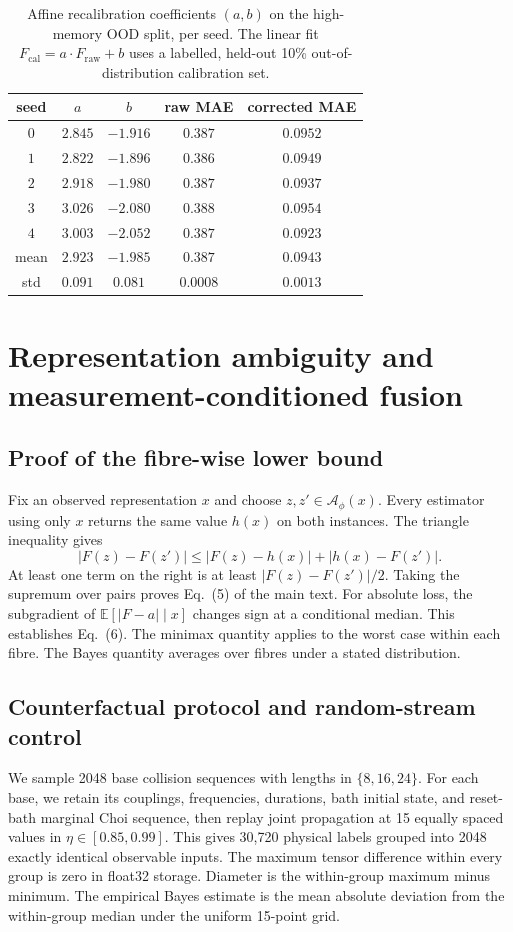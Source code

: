 \documentclass[10pt]{article}
\begin{document}
\begin{table}[h]
\centering
\caption{Affine recalibration coefficients $(a, b)$ on the high-memory OOD split, per seed. The linear fit $F_{\mathrm{cal}} = a \cdot F_{\mathrm{raw}} + b$ uses a labelled, held-out 10\% out-of-distribution calibration set.}
\label{tab:supp_per_seed_ab}
\begin{tabular}{ccccc}
\toprule
seed & $a$ & $b$ & raw MAE & corrected MAE \\
\midrule
$0$ & $2.845$ & $-1.916$ & $0.387$ & $0.0952$ \\
$1$ & $2.822$ & $-1.896$ & $0.386$ & $0.0949$ \\
$2$ & $2.918$ & $-1.980$ & $0.387$ & $0.0937$ \\
$3$ & $3.026$ & $-2.080$ & $0.388$ & $0.0954$ \\
$4$ & $3.003$ & $-2.052$ & $0.387$ & $0.0923$ \\
\midrule
mean & $2.923$ & $-1.985$ & $0.387$ & $0.0943$ \\
std & $0.091$ & $0.081$ & $0.0008$ & $0.0013$ \\
\bottomrule
\end{tabular}
\end{table}

\section{Representation ambiguity and measurement-conditioned fusion}
\label{supp:identifiability}

\subsection{Proof of the fibre-wise lower bound}
Fix an observed representation $x$ and choose $z,z'\in\mathcal A_\phi(x)$. Every estimator using only $x$ returns the same value $h(x)$ on both instances. The triangle inequality gives
\[
|F(z)-F(z')|\leq |F(z)-h(x)|+|h(x)-F(z')|.
\]
At least one term on the right is at least $|F(z)-F(z')|/2$. Taking the supremum over pairs proves Eq.~(5) of the main text. For absolute loss, the subgradient of $\mathbb E[|F-a|\mid x]$ changes sign at a conditional median. This establishes Eq.~(6). The minimax quantity applies to the worst case within each fibre. The Bayes quantity averages over fibres under a stated distribution.

\subsection{Counterfactual protocol and random-stream control}
We sample 2048 base collision sequences with lengths in $\{8,16,24\}$. For each base, we retain its couplings, frequencies, durations, bath initial state, and reset-bath marginal Choi sequence, then replay joint propagation at 15 equally spaced values in $\eta\in[0.85,0.99]$. This gives 30,720 physical labels grouped into 2048 exactly identical observable inputs. The maximum tensor difference within every group is zero in float32 storage. Diameter is the within-group maximum minus minimum. The empirical Bayes estimate is the mean absolute deviation from the within-group median under the uniform 15-point grid.
\end{document}
